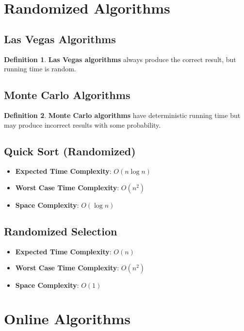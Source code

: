 \documentclass[11pt]{article}
\theoremstyle{definition}
\newtheorem{definition}{Definition}[section]
\begin{document}
\section{Randomized Algorithms}

\subsection{Las Vegas Algorithms}
\begin{definition}
\textbf{Las Vegas algorithms} always produce the correct result, but running time is random.
\end{definition}

\subsection{Monte Carlo Algorithms}
\begin{definition}
\textbf{Monte Carlo algorithms} have deterministic running time but may produce incorrect results with some probability.
\end{definition}

\subsection{Quick Sort (Randomized)}
\begin{itemize}
    \item \textbf{Expected Time Complexity}: $O(n \log n)$
    \item \textbf{Worst Case Time Complexity}: $O(n^2)$
    \item \textbf{Space Complexity}: $O(\log n)$
\end{itemize}

\subsection{Randomized Selection}
\begin{itemize}
    \item \textbf{Expected Time Complexity}: $O(n)$
    \item \textbf{Worst Case Time Complexity}: $O(n^2)$
    \item \textbf{Space Complexity}: $O(1)$
\end{itemize}

\section{Online Algorithms}
\end{document}
